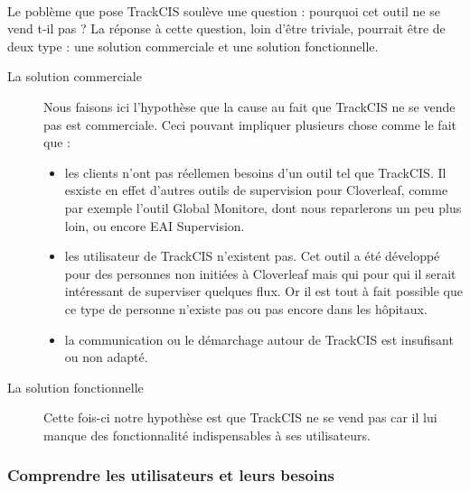 		\paragraph{}%
		Le poblème que pose TrackCIS soulève une question : pourquoi cet outil ne se
		vend t-il pas ? La réponse à cette question, loin d'être triviale, pourrait
		être de deux type : une solution commerciale et une solution fonctionnelle.
		\begin{description}
			\item[La solution commerciale] Nous faisons ici l'hypothèse que la cause au
			fait que TrackCIS ne se vende pas est commerciale. Ceci pouvant impliquer
			plusieurs chose comme le fait que :
			\begin{itemize}
			  \item les clients n'ont pas réellemen besoins d'un outil tel que TrackCIS.
			  Il esxiste en effet d'autres outils de supervision pour Cloverleaf, comme
			  par exemple l'outil Global Monitore, dont nous reparlerons un peu plus
			  loin, ou encore EAI Supervision.
			  \item les utilisateur de TrackCIS n'existent pas. Cet outil a été développé
			  pour des personnes non initiées à Cloverleaf mais qui pour qui il serait
			  intéressant de superviser quelques flux.
			  Or il est tout à fait possible que ce type de personne n'existe pas ou pas
			  encore dans les hôpitaux.
			  \item la communication ou le démarchage autour de TrackCIS est insufisant
			  ou non adapté.
			\end{itemize}
			\item[La solution fonctionnelle] Cette fois-ci notre hypothèse est que
			TrackCIS ne se vend pas car il lui manque des fonctionnalité indispensables à
			ses utilisateurs.
		\end{description}
		
		\subsubsection{Comprendre les utilisateurs et leurs besoins}
			\paragraph{}%
			
			\paragraph{}%
			
